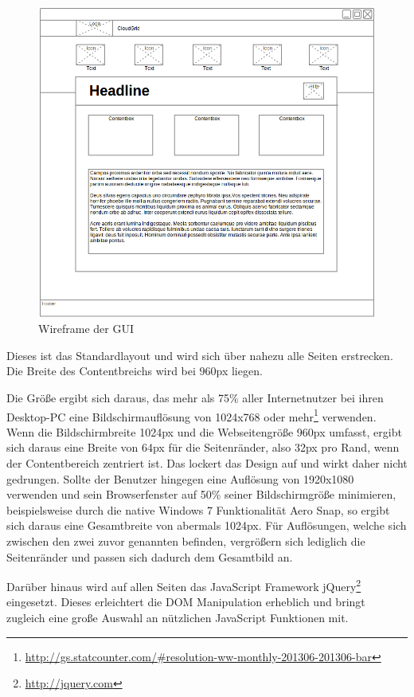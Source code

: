 \begin{figure}[H]
  \centering
  \includegraphics[width=\textwidth]{resources/Bilder_Kapitel_4/gui-final.png}
  \caption{Wireframe der GUI}
  \label{fig-entwurf-gui}
\end{figure}

Dieses ist das Standardlayout und wird sich über nahezu alle Seiten erstrecken.
Die Breite des Contentbreichs wird bei 960px liegen.

Die Größe ergibt sich daraus, das mehr als 75\% aller Internetnutzer bei ihren Desktop-PC eine Bildschirmauflösung von 1024x768 oder mehr\footnote{\url{http://gs.statcounter.com/\#resolution-ww-monthly-201306-201306-bar}} verwenden.
Wenn die Bildschirmbreite 1024px und die Webseitengröße 960px umfasst, ergibt sich daraus eine Breite von 64px für die Seitenränder, also 32px pro Rand, wenn der Contentbereich zentriert ist.
Das lockert das Design auf und wirkt daher nicht gedrungen.
Sollte der Benutzer hingegen eine Auflösung von 1920x1080 verwenden und sein Browserfenster auf 50\% seiner Bildschirmgröße minimieren, beispielsweise durch die native Windows 7 Funktionalität Aero Snap, so ergibt sich daraus eine Gesamtbreite von abermals 1024px.
Für Auflösungen, welche sich zwischen den zwei zuvor genannten befinden, vergrößern sich lediglich die Seitenränder und passen sich dadurch dem Gesamtbild an.

Darüber hinaus wird auf allen Seiten das JavaScript Framework jQuery\footnote{\url{http://jquery.com}} eingesetzt.
Dieses erleichtert die \ac{DOM} Manipulation erheblich und bringt zugleich eine große Auswahl an nützlichen JavaScript Funktionen mit.

